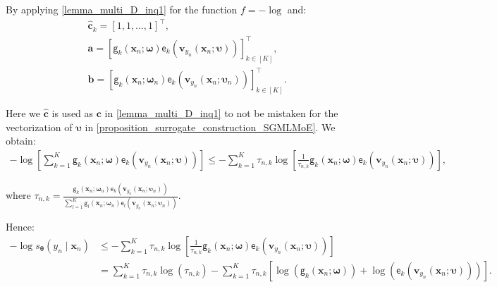 \documentclass{article}
\newcommand{\nn}{\nonumber} %
\def\sfg{\mathsf{g}}
\def\ex{\mathsf{e}}
\def\vomega{{\bm{\omega}}}
\def\vupsilon{{\bm{\upsilon}}}
\def\vtheta{{\bm{\theta}}}
\def\va{{\bm{a}}}
\def\vb{{\bm{b}}}
\def\vc{{\bm{c}}}
\def\vv{{\bm{v}}}
\def\vx{{\bm{x}}}
\begin{document}
By applying \cref{lemma_multi_D_inq1} for the function $f=-\log$ and: 
\begin{align*}
	&\hat{\vc}_k=[1,1,\dots,1]^{\top},\\
	&\va=[\sfg_k\left(\vx_n; \vomega \right) \ex_k(\vv_{y_n}(\vx_n;\vupsilon))]_{k\in[K]}^{\top},\\
    &\vb=[\sfg_k\left(\vx_n; \vomega_n \right) \ex_k(\vv_{y_n}(\vx_n;\vupsilon_n))]_{k\in[K]}^{\top}.
\end{align*}
\par Here we $\hat{\vc}$ is used as $\vc$ in \cref{lemma_multi_D_inq1} to not be mistaken for the vectorization of $\vupsilon$ in \cref{proposition_surrogate_construction_SGMLMoE}. We obtain:
\begin{align*}
	-\log \left[\sum_{k=1}^{K} \sfg_k\left(\vx_n; \vomega \right) \ex_k(\vv_{y_n}(\vx_n;\vupsilon))\right] \leq -\sum_{k=1}^K\tau_{n,k}\log\left[\frac{1}{\tau_{n,k}}\sfg_k\left(\vx_n; \vomega \right) \ex_k(\vv_{y_n}(\vx_n;\vupsilon))\right],
\end{align*}
\par where $\tau_{n,k}=\frac{\sfg_k\left(\vx_n; \vomega_n \right) \ex_k(\vv_{y_n}(\vx_n;\vupsilon_n))}{\sum_{l=1}^{K}\sfg_l\left(\vx_n; \vomega_n \right) \ex_l(\vv_{y_n}(\vx_n;\vupsilon_n))}$.
\par Hence:
\begin{align*}
	-\log s_{\vtheta}(y_n\mid \vx_n) &\le -\sum_{k=1}^K\tau_{n,k}\log\left[\frac{1}{\tau_{n,k}}\sfg_k\left(\vx_n; \vomega \right) \ex_k(\vv_{y_n}(\vx_n;\vupsilon))\right]\nn\\
    &=\sum_{k=1}^{K}\tau_{n,k}\log(\tau_{n,k})-\sum_{k=1}^{K}\tau_{n,k}\left[\log(\sfg_k\left(\vx_n; \vomega \right))+\log(\ex_k(\vv_{y_n}(\vx_n;\vupsilon)))\right].
\end{align*}    
\end{document}
